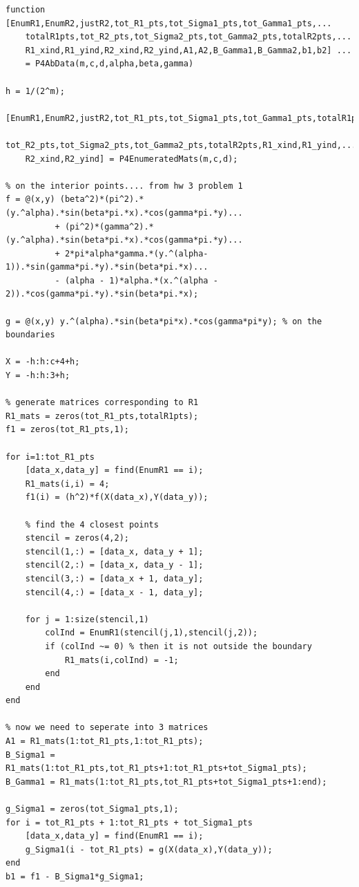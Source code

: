 \documentclass[12pt]{article}
\begin{document}
\lstset{language=matlab,frame=single}
\begin{lstlisting}[caption=Generate Matrices and Vectors]
function [EnumR1,EnumR2,justR2,tot_R1_pts,tot_Sigma1_pts,tot_Gamma1_pts,...
    totalR1pts,tot_R2_pts,tot_Sigma2_pts,tot_Gamma2_pts,totalR2pts,...
    R1_xind,R1_yind,R2_xind,R2_yind,A1,A2,B_Gamma1,B_Gamma2,b1,b2] ...
    = P4AbData(m,c,d,alpha,beta,gamma)

h = 1/(2^m);

[EnumR1,EnumR2,justR2,tot_R1_pts,tot_Sigma1_pts,tot_Gamma1_pts,totalR1pts,...
    tot_R2_pts,tot_Sigma2_pts,tot_Gamma2_pts,totalR2pts,R1_xind,R1_yind,...
    R2_xind,R2_yind] = P4EnumeratedMats(m,c,d);

% on the interior points.... from hw 3 problem 1
f = @(x,y) (beta^2)*(pi^2).*(y.^alpha).*sin(beta*pi.*x).*cos(gamma*pi.*y)...
          + (pi^2)*(gamma^2).*(y.^alpha).*sin(beta*pi.*x).*cos(gamma*pi.*y)...
          + 2*pi*alpha*gamma.*(y.^(alpha-1)).*sin(gamma*pi.*y).*sin(beta*pi.*x)...
          - (alpha - 1)*alpha.*(x.^(alpha - 2)).*cos(gamma*pi.*y).*sin(beta*pi.*x);

g = @(x,y) y.^(alpha).*sin(beta*pi*x).*cos(gamma*pi*y); % on the boundaries

X = -h:h:c+4+h;
Y = -h:h:3+h;

% generate matrices corresponding to R1
R1_mats = zeros(tot_R1_pts,totalR1pts);
f1 = zeros(tot_R1_pts,1);

for i=1:tot_R1_pts 
    [data_x,data_y] = find(EnumR1 == i);
    R1_mats(i,i) = 4;
    f1(i) = (h^2)*f(X(data_x),Y(data_y));
    
    % find the 4 closest points
    stencil = zeros(4,2);
    stencil(1,:) = [data_x, data_y + 1];
    stencil(2,:) = [data_x, data_y - 1];
    stencil(3,:) = [data_x + 1, data_y];
    stencil(4,:) = [data_x - 1, data_y];
    
    for j = 1:size(stencil,1)
        colInd = EnumR1(stencil(j,1),stencil(j,2));
        if (colInd ~= 0) % then it is not outside the boundary
            R1_mats(i,colInd) = -1;
        end
    end
end

% now we need to seperate into 3 matrices
A1 = R1_mats(1:tot_R1_pts,1:tot_R1_pts);
B_Sigma1 = R1_mats(1:tot_R1_pts,tot_R1_pts+1:tot_R1_pts+tot_Sigma1_pts);
B_Gamma1 = R1_mats(1:tot_R1_pts,tot_R1_pts+tot_Sigma1_pts+1:end);

g_Sigma1 = zeros(tot_Sigma1_pts,1);
for i = tot_R1_pts + 1:tot_R1_pts + tot_Sigma1_pts
    [data_x,data_y] = find(EnumR1 == i);
    g_Sigma1(i - tot_R1_pts) = g(X(data_x),Y(data_y));
end
b1 = f1 - B_Sigma1*g_Sigma1;


\end{lstlisting}
\end{document}
